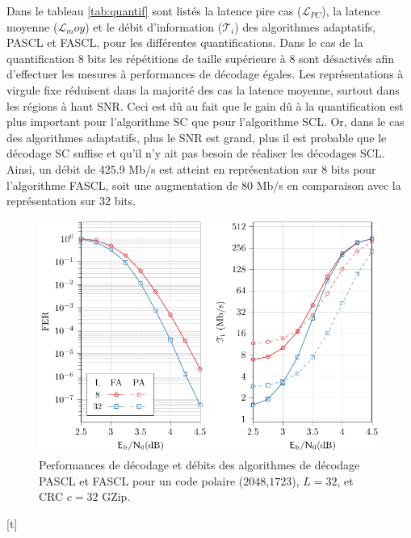 Dans le tableau \ref{tab:quantif} sont listés la latence \og pire cas \fg ($\mathcal{L}_{PC}$), la latence moyenne ($\mathcal{L}_moy$) et le débit d'information ($\mathcal{T}_i$) des algorithmes adaptatifs, PASCL et FASCL, pour les différentes quantifications. Dans le cas de la quantification 8 bits les \noeuds répétitions de taille supérieure à 8 sont désactivés afin d'effectuer les mesures à performances de décodage égales. Les représentations à virgule fixe réduisent dans la majorité des cas la latence moyenne, surtout dans les régions à haut SNR. Ceci est dû au fait que le gain dû à la quantification est plus important pour l'algorithme SC que pour l'algorithme SCL. Or, dans le cas des algorithmes adaptatifs, plus le SNR est grand, plus il est probable que le décodage SC suffise et qu'il n'y ait pas besoin de réaliser les décodages SCL. Ainsi, un débit de 425.9 Mb/s est atteint en représentation sur 8 bits pour l'algorithme FASCL, soit une augmentation de 80 Mb/s en comparaison avec la représentation sur 32 bits.
\begin{figure}[t]
\includegraphics{main/ch2_fig/curves/ascl/tikz/ascl}
\caption{Performances de décodage et débits des algorithmes de décodage PASCL et FASCL pour un code polaire ($2048$,$1723$), $L=32$, et CRC $c=32$ GZip.}
\label{fig:ascl_perfs}
\end{figure}[t]

